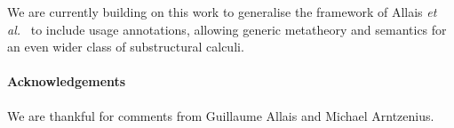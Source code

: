 \documentclass[submission,copyright,creativecommons]{eptcs}
\begin{document}
We are currently building on this work to generalise the framework of Allais
\emph{et al.}~\cite{AACMM20} to include usage annotations, allowing
generic metatheory and semantics for an even wider class of
substructural calculi.

\paragraph{Acknowledgements}
We are thankful for comments from Guillaume Allais and Michael Arntzenius.



\end{document}
